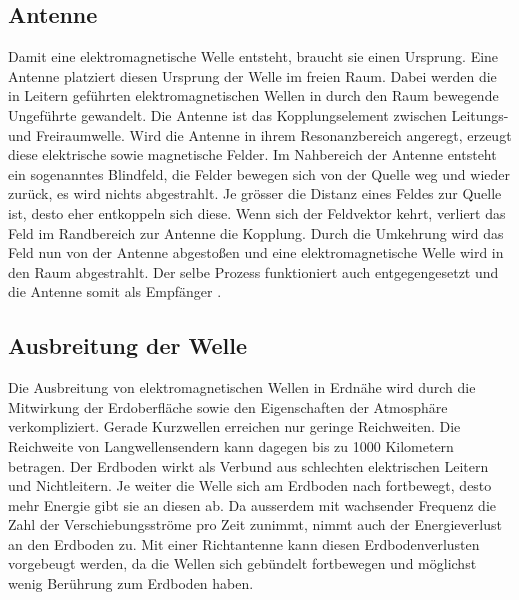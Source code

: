 \begin{refsection}
\subsection{Antenne}
Damit eine elektromagnetische Welle entsteht, braucht sie einen Ursprung.
Eine Antenne platziert diesen Ursprung der Welle im freien Raum.
Dabei werden die in Leitern geführten elektromagnetischen Wellen in durch den Raum bewegende Ungeführte gewandelt.
Die Antenne ist das Kopplungselement zwischen Leitungs- und Freiraumwelle.
Wird die Antenne in ihrem Resonanzbereich angeregt, erzeugt diese elektrische sowie magnetische Felder.
Im Nahbereich der Antenne entsteht ein sogenanntes Blindfeld, die Felder bewegen sich von der Quelle weg und wieder zurück, es wird nichts abgestrahlt.
Je grösser die Distanz eines Feldes zur Quelle ist, desto eher entkoppeln sich diese.
Wenn sich der Feldvektor kehrt, verliert das Feld im Randbereich zur Antenne die Kopplung.
Durch die Umkehrung wird das Feld nun von der Antenne abgestoßen und eine elektromagnetische Welle wird in den Raum abgestrahlt.
Der selbe Prozess funktioniert auch entgegengesetzt und die Antenne somit als Empfänger \cite{buch:unger}.

\subsection{Ausbreitung der Welle}
Die Ausbreitung von elektromagnetischen Wellen in Erdnähe wird durch die Mitwirkung der Erdoberfläche sowie den Eigenschaften der Atmosphäre verkompliziert.
Gerade Kurzwellen erreichen nur geringe Reichweiten.
Die Reichweite von Langwellensendern kann dagegen bis zu 1000 Kilometern betragen.
Der Erdboden wirkt als Verbund aus schlechten elektrischen Leitern und Nichtleitern. 
Je weiter die Welle sich am Erdboden nach fortbewegt, desto mehr Energie gibt sie an diesen ab.
Da ausserdem mit wachsender Frequenz die Zahl der Verschiebungsströme pro Zeit zunimmt, nimmt auch der Energieverlust an den Erdboden zu.
Mit einer Richtantenne kann diesen Erdbodenverlusten vorgebeugt werden, da die Wellen sich gebündelt fortbewegen und möglichst wenig Berührung zum Erdboden haben.


\end{refsection}
